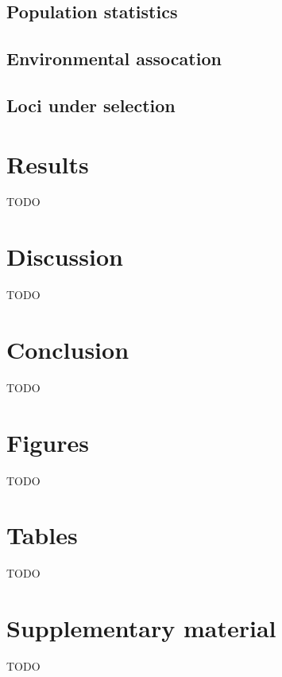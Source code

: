 \documentclass[fleqn,11pt]{wlpeerj}
\begin{document}
\subsection*{Population statistics}

\subsection*{Environmental assocation}

\subsection*{Loci under selection}


\subsection*{}

\section*{Results}
TODO


\section*{Discussion}
TODO


\section*{Conclusion}
TODO


\section*{Figures}
TODO

\section*{Tables}
TODO

\section*{Supplementary material}
TODO

\clearpage

\end{document}
